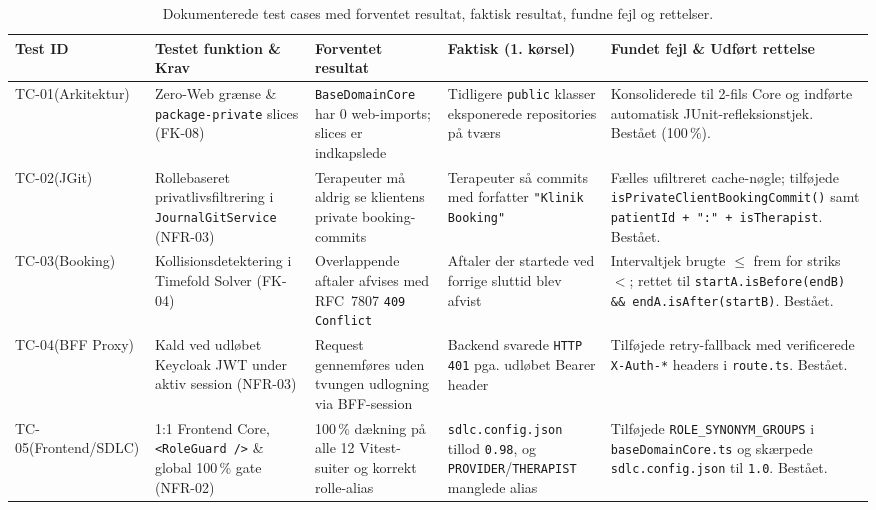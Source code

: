 \documentclass[11pt,a4paper]{article}
\begin{document}
\begin{table}[htbp]
\begin{table}[htbp]
\centering
\footnotesize
\begin{tabularx}{\textwidth}{P{2.2cm} P{2.8cm} P{2.4cm} P{2.5cm} Y}
\toprule
\textbf{Test ID} & \textbf{Testet funktion \& Krav} & \textbf{Forventet resultat} & \textbf{Faktisk (1. kørsel)} & \textbf{Fundet fejl \& Udført rettelse} \\
\midrule
TC-01\newline (Arkitektur) & Zero-Web grænse \& \texttt{package-private} slices (FK-08) & \texttt{BaseDomainCore} har 0 web-imports; slices er indkapslede & Tidligere \texttt{public} klasser eksponerede repositories på tværs & Konsoliderede til 2-fils Core og indførte automatisk JUnit-refleksionstjek. Bestået (100\,\%). \\
\addlinespace
TC-02\newline (JGit) & Rollebaseret privatlivsfiltrering i \texttt{JournalGitService} (NFR-03) & Terapeuter må aldrig se klientens private booking-commits & Terapeuter så commits med forfatter \texttt{"Klinik Booking"} & Fælles ufiltreret cache-nøgle; tilføjede \texttt{isPrivateClient\allowbreak BookingCommit()} samt \texttt{patientId + ":" + isTherapist}. Bestået. \\
\addlinespace
TC-03\newline (Booking) & Kollisionsdetektering i Timefold Solver (FK-04) & Overlappende aftaler afvises med RFC~7807 \texttt{409 Conflict} & Aftaler der startede ved forrige sluttid blev afvist & Intervaltjek brugte $\le$ frem for striks $<$; rettet til \texttt{startA.isBefore(endB) \&\& endA.isAfter(startB)}. Bestået. \\
\addlinespace
TC-04\newline (BFF Proxy) & Kald ved udløbet Keycloak JWT under aktiv session (NFR-03) & Request gennemføres uden tvungen udlogning via BFF-session & Backend svarede \texttt{HTTP 401} pga. udløbet Bearer header & Tilføjede retry-fallback med verificerede \texttt{X-Auth-*} headers i \texttt{route.ts}. Bestået. \\
\addlinespace
TC-05\newline (Frontend/SDLC) & 1:1 Frontend Core, \texttt{<RoleGuard />} \& global 100\,\% gate (NFR-02) & 100\,\% dækning på alle 12 Vitest-suiter og korrekt rolle-alias & \texttt{sdlc.config.json} tillod \texttt{0.98}, og \texttt{PROVIDER}/\allowbreak\texttt{THERAPIST} manglede alias & Tilføjede \texttt{ROLE\_SYNONYM\_GROUPS} i \texttt{baseDomainCore.ts} og skærpede \texttt{sdlc.config.json} til \texttt{1.0}. Bestået. \\
\bottomrule
\end{tabularx}
\caption{Dokumenterede test cases med forventet resultat, faktisk resultat, fundne fejl og rettelser.}
\label{tab:test_cases}
\end{table}


\end{table}
\end{document}
